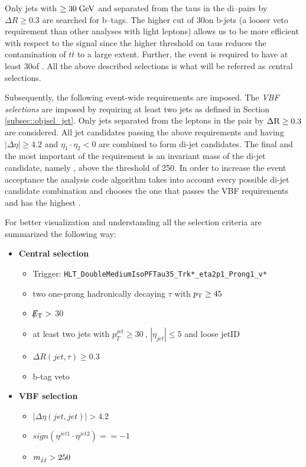 Only jets with \pt $\ge 30\;\text{Ge}\kern-0.06667em\text{V}$ and separated from the taus in the di--\hadtau pairs by $\Delta R \ge 0.3$ are searched for b--tags. The higher \pt cut of 30\gev on b-jets (a looser veto requirement than other analyses with light leptons) allows us to be more efficient with respect to the signal since the higher \pt threshold on taus reduces the contamination of $t\overline{t}$ to a large extent. Further, the event is required to have at least 30\gev of \met. All the above described selections is what will be referred as {\textit central selections}.

Subsequently, the following event-wide requirements are imposed. The {\textit {VBF selections}} are imposed by requiring at least two jets as defined in Section \ref{subsec::objsel_jet}. Only jets separated from the leptons in the \hadtau\hadtau pair by $\Delta \text{R} \ge 0.3$ are considered. All jet candidates passing the above requirements and having $\vert \Delta\eta \vert \ge 4.2$ and $\eta_{1}\cdot\eta_{2} < 0$ are combined to form di-jet candidates. The final and the most important of the requirement is an invariant mass of the di-jet candidate, namely \mjj, above the threshold of 250\gev. In order to increase the event acceptance the analysis code algorithm takes into account every possible di-jet candidate combination and chooses the one that passes the VBF requirements and has the highest \mjj. 

For better visualization and understanding all the selection criteria are summarized the following way:


\begin{itemize}
	\item \textbf{Central selection}
	\begin{itemize}
		\item Trigger: \texttt{HLT\_DoubleMediumIsoPFTau35\_Trk*\_eta2p1\_Prong1\_v*}
		\item two one-prong hadronically decaying $\tau$ with $p_{\text{T}}\geq45~$\gev 
		\item $\slash\mkern-12mu{E}_{\text{T}} > $ 30
		\item at least two jets with $p_{T}^{jet}\geq30~$\gev, $|\eta_{jet}|\leq5$ and loose jetID
		\item $\Delta R(jet,\tau)\geq0.3$
		\item b-tag veto
	\end{itemize}
	\item \textbf{VBF selection}
	\begin{itemize}
		\item $|\Delta\eta(jet,jet)| > 4.2$
		\item $sign(\eta^{jet 1}\cdot\eta^{jet 2})==-1$
		\item $m_{jj}>250~$\gev
	\end{itemize}
\end{itemize}

